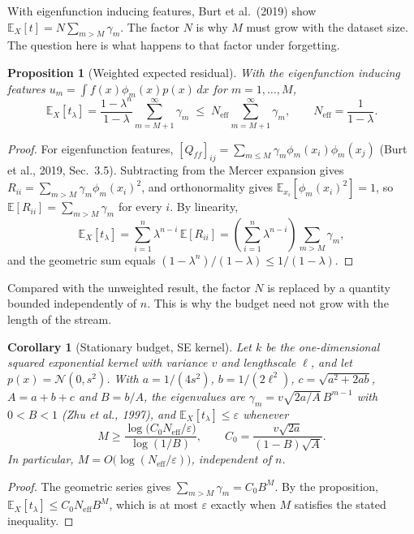 \documentclass[11pt,a4paper]{article}
\newtheorem{proposition}{Proposition}
\newtheorem{corollary}{Corollary}
\theoremstyle{definition}
\theoremstyle{remark}
\newcommand{\Neff}{N_{\mathrm{eff}}}
\begin{document}
With eigenfunction inducing features, Burt et al.\ (2019) show $\mathbb{E}_X[t] = N\sum_{m>M}\gamma_m$. The factor $N$ is why $M$ must grow with the dataset size. The question here is what happens to that factor under forgetting.

\begin{proposition}[Weighted expected residual]
With the eigenfunction inducing features $u_m = \int f(x)\phi_m(x)p(x)\,dx$ for $m = 1, \ldots, M$,
\[
\mathbb{E}_X\left[t_\lambda\right] = \frac{1 - \lambda^n}{1 - \lambda}\sum_{m=M+1}^{\infty}\gamma_m \;\leq\; \Neff\sum_{m=M+1}^{\infty}\gamma_m, \qquad \Neff = \frac{1}{1-\lambda}.
\]
\end{proposition}

\begin{proof}
For eigenfunction features, $[Q_{ff}]_{ij} = \sum_{m \leq M}\gamma_m\phi_m(x_i)\phi_m(x_j)$ (Burt et al., 2019, Sec.~3.5). Subtracting from the Mercer expansion gives $R_{ii} = \sum_{m > M}\gamma_m\phi_m(x_i)^2$, and orthonormality gives $\mathbb{E}_{x_i}[\phi_m(x_i)^2] = 1$, so $\mathbb{E}[R_{ii}] = \sum_{m>M}\gamma_m$ for every $i$. By linearity,
\[
\mathbb{E}_X[t_\lambda] = \sum_{i=1}^{n}\lambda^{n-i}\,\mathbb{E}[R_{ii}] = \left(\sum_{i=1}^{n}\lambda^{n-i}\right)\sum_{m>M}\gamma_m,
\]
and the geometric sum equals $(1-\lambda^n)/(1-\lambda) \leq 1/(1-\lambda)$.
\end{proof}

Compared with the unweighted result, the factor $N$ is replaced by a quantity bounded independently of $n$. This is why the budget need not grow with the length of the stream.

\begin{corollary}[Stationary budget, SE kernel]
Let $k$ be the one-dimensional squared exponential kernel with variance $v$ and lengthscale $\ell$, and let $p(x) = \mathcal{N}(0, s^2)$. With $a = 1/(4s^2)$, $b = 1/(2\ell^2)$, $c = \sqrt{a^2 + 2ab}$, $A = a + b + c$ and $B = b/A$, the eigenvalues are $\gamma_m = v\sqrt{2a/A}\,B^{m-1}$ with $0 < B < 1$ (Zhu et al., 1997), and $\mathbb{E}_X[t_\lambda] \leq \varepsilon$ whenever
\[
M \geq \frac{\log\!\big(C_0 \Neff/\varepsilon\big)}{\log(1/B)}, \qquad C_0 = \frac{v\sqrt{2a}}{(1-B)\sqrt{A}}.
\]
In particular, $M = O\big(\log(\Neff/\varepsilon)\big)$, independent of $n$.
\end{corollary}

\begin{proof}
The geometric series gives $\sum_{m>M}\gamma_m = C_0 B^M$. By the proposition, $\mathbb{E}_X[t_\lambda] \leq C_0 \Neff B^M$, which is at most $\varepsilon$ exactly when $M$ satisfies the stated inequality.
\end{proof}
\end{document}
